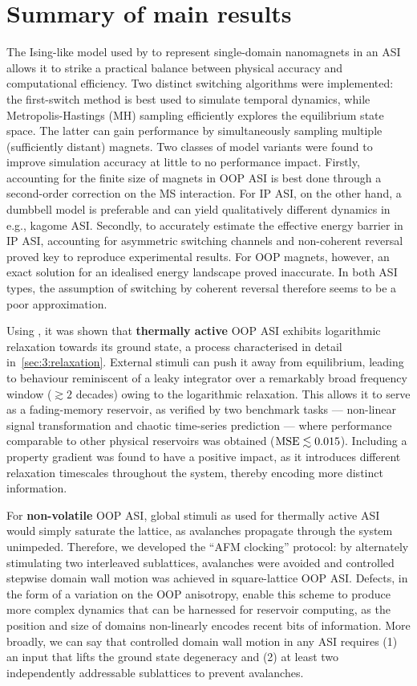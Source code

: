 \section{Summary of main results}
The Ising-like model used by \textbf{\hotspice} to represent single-domain nanomagnets in an ASI allows it to strike a practical balance between physical accuracy and computational efficiency.
Two distinct switching algorithms were implemented: the first-switch method is best used to simulate temporal dynamics, while Metropolis-Hastings (MH) sampling efficiently explores the equilibrium state space.
The latter can gain performance by simultaneously sampling multiple (sufficiently distant) magnets.
Two classes of model variants were found to improve simulation accuracy at little to no performance impact.
Firstly, accounting for the finite size of magnets in OOP ASI is best done through a second-order correction on the MS interaction.
For IP ASI, on the other hand, a dumbbell model is preferable and can yield qualitatively different dynamics in e.g., kagome ASI.
Secondly, to accurately estimate the effective energy barrier in IP ASI, accounting for asymmetric switching channels and non-coherent reversal proved key to reproduce experimental results.
For OOP magnets, however, an exact solution for an idealised energy landscape proved inaccurate.
In both ASI types, the assumption of switching by coherent reversal therefore seems to be a poor approximation. \par
Using \hotspice, it was shown that \textbf{thermally active} OOP ASI exhibits logarithmic relaxation towards its ground state, a process characterised in detail in~\cref{sec:3:relaxation}.
External stimuli can push it away from equilibrium, leading to behaviour reminiscent of a leaky integrator over a remarkably broad frequency window ($\gtrsim 2$ decades) owing to the logarithmic relaxation.
This allows it to serve as a fading-memory reservoir, as verified by two benchmark tasks --- non-linear signal transformation and chaotic time-series prediction --- where performance comparable to other physical reservoirs was obtained ($\mathrm{MSE} \lesssim 0.015$).
Including a property gradient was found to have a positive impact, as it introduces different relaxation timescales throughout the system, thereby encoding more distinct information. \par
For \textbf{non-volatile} OOP ASI, global stimuli as used for thermally active ASI would simply saturate the lattice, as avalanches propagate through the system unimpeded.
Therefore, we developed the ``AFM clocking'' protocol: by alternately stimulating two interleaved sublattices, avalanches were avoided and controlled stepwise domain wall motion was achieved in square-lattice OOP ASI.
Defects, in the form of a variation on the OOP anisotropy, enable this scheme to produce more complex dynamics that can be harnessed for reservoir computing, as the position and size of domains non-linearly encodes recent bits of information.
More broadly, we can say that controlled domain wall motion in any ASI requires (1) an input that lifts the ground state degeneracy and (2) at least two independently addressable sublattices to prevent avalanches. \\\par


